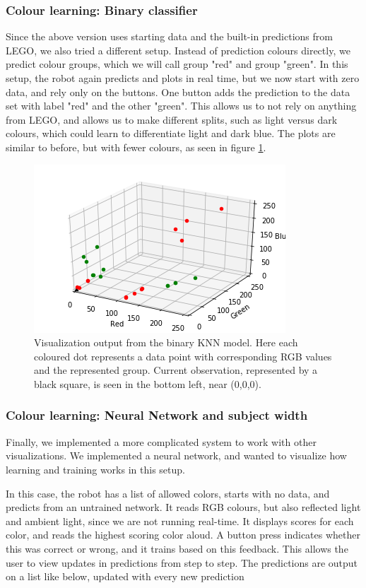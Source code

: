 \documentclass[11pt, a4paper]{article}
\begin{document}
\subsubsection{Colour learning: Binary classifier}
Since the above version uses starting data and the built-in predictions from LEGO, we also tried a different setup. Instead of prediction colours directly, we predict colour groups, which we will call group "red" and group "green". In this setup, the robot again predicts and plots in real time, but we now start with zero data, and rely only on the buttons. One button adds the prediction to the data set with label "red" and the other "green". This allows us to not rely on anything from LEGO, and allows us to make different splits, such as light versus dark colours, which could learn to differentiate light and dark blue. The plots are similar to before, but with fewer colours, as seen in figure \ref{fig:colour_KNN_binary}.

\begin{figure}[H]
	\centering
	\includegraphics[scale=1]{images/ColourKNNversion2.png}	
	\caption{Visualization output from the binary KNN model. Here each coloured dot represents a data point with corresponding RGB values and the represented group. Current observation, represented by a black square, is seen in the bottom left, near (0,0,0).}
	\label{fig:colour_KNN_binary}
\end{figure}
\subsubsection{Colour learning: Neural Network and subject width}
Finally, we implemented a more complicated system to work with other visualizations. We implemented a neural network, and wanted to visualize how learning and training works in this setup. 

In this case, the robot has a list of allowed colors, starts with no data, and predicts from an untrained network. It reads RGB colours, but also reflected light and ambient light, since we are not running real-time. It displays scores for each color, and reads the highest scoring color aloud. A button press indicates whether this was correct or wrong, and it trains based on this feedback. This allows the user to view updates in predictions from step to step. The predictions are output on a list like below, updated with every new prediction \\
\end{document}
